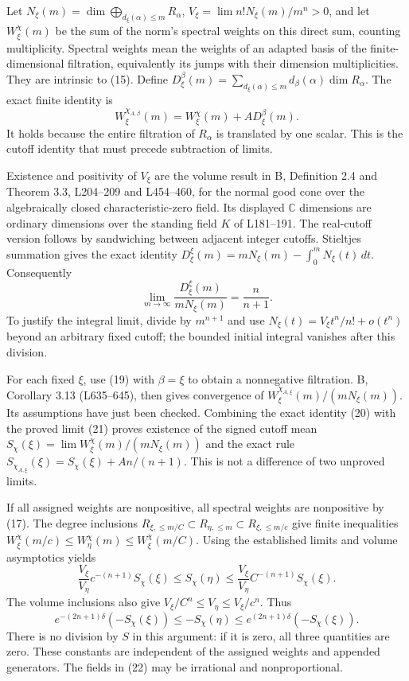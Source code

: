 \documentclass[
  11pt,
]{article}
\begin{document}
Let \(N_\xi(m)=\dim\bigoplus_{d_\xi(\alpha)\leq m}R_\alpha\),
\(V_\xi=\lim n!N_\xi(m)/m^n>0\), and let \(W_\xi^\chi(m)\) be the sum of
the norm's spectral weights on this direct sum, counting multiplicity.
Spectral weights mean the weights of an adapted basis of the
finite-dimensional filtration, equivalently its jumps with their
dimension multiplicities. They are intrinsic to (15). Define
\(D_\xi^\beta(m)=\sum_{d_\xi(\alpha)\leq m}
d_\beta(\alpha)\dim R_\alpha\). The exact finite identity is \[
 W_\xi^{\chi_{A,\beta}}(m)=W_\xi^\chi(m)+A D_\xi^\beta(m).
 \tag{20}
\] It holds because the entire filtration of \(R_\alpha\) is translated
by one scalar. This is the cutoff identity that must precede subtraction
of limits.

Existence and positivity of \(V_\xi\) are the volume result in B,
Definition 2.4 and Theorem 3.3, L204--209 and L454--460, for the normal
good cone over the algebraically closed characteristic-zero field. Its
displayed \(\mathbb C\) dimensions are ordinary dimensions over the
standing field \(K\) of L181--191. The real-cutoff version follows by
sandwiching between adjacent integer cutoffs. Stieltjes summation gives
the exact identity \(D_\xi^\xi(m)=mN_\xi(m)-\int_0^mN_\xi(t)\,dt\).
Consequently \[
 \lim_{m\to\infty}\frac{D_\xi^\xi(m)}{mN_\xi(m)}=
 \frac{n}{n+1}.                                    \tag{21}
\] To justify the integral limit, divide by \(m^{n+1}\) and use
\(N_\xi(t)=V_\xi t^n/n!+o(t^n)\) beyond an arbitrary fixed cutoff; the
bounded initial integral vanishes after this division.

For each fixed \(\xi\), use (19) with \(\beta=\xi\) to obtain a
nonnegative filtration. B, Corollary 3.13 (L635--645), then gives
convergence of \(W_\xi^{\chi_{A,\xi}}(m)/(mN_\xi(m))\). Its assumptions
have just been checked. Combining the exact identity (20) with the
proved limit (21) proves existence of the signed cutoff mean
\(S_\chi(\xi)=\lim W_\xi^\chi(m)/(mN_\xi(m))\) and the exact rule
\(S_{\chi_{A,\xi}}(\xi)=S_\chi(\xi)+A n/(n+1)\). This is not a
difference of two unproved limits.

If all assigned weights are nonpositive, all spectral weights are
nonpositive by (17). The degree inclusions
\(R_{\xi,\leq m/C}\subset R_{\eta,\leq m}
\subset R_{\xi,\leq m/c}\) give finite inequalities
\(W_\xi^\chi(m/c)\leq W_\eta^\chi(m)\leq W_\xi^\chi(m/C)\). Using the
established limits and volume asymptotics yields \[
 \frac{V_\xi}{V_\eta}c^{-(n+1)}S_\chi(\xi)
 \leq S_\chi(\eta)\leq
 \frac{V_\xi}{V_\eta}C^{-(n+1)}S_\chi(\xi).          \tag{22}
\] The volume inclusions also give
\(V_\xi/C^n\leq V_\eta\leq V_\xi/c^n\). Thus \[
 e^{-(2n+1)\delta}(-S_\chi(\xi))
 \leq -S_\chi(\eta)\leq
 e^{(2n+1)\delta}(-S_\chi(\xi)).                    \tag{23}
\] There is no division by \(S\) in this argument: if it is zero, all
three quantities are zero. These constants are independent of the
assigned weights and appended generators. The fields in (22) may be
irrational and nonproportional.
\end{document}
